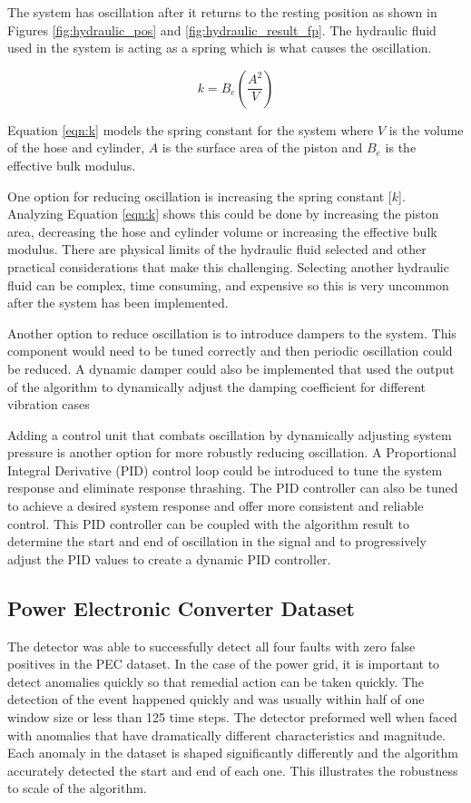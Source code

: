 The system has oscillation after it returns to the resting position as shown in Figures \ref{fig:hydraulic_pos} and \ref{fig:hydraulic_result_fp}. The hydraulic fluid used in the system is acting as a spring which is what causes the oscillation. 

\begin{equation}
    k = B_e \left ( \frac{A^2}{V} \right)
    \label{eqn:k}
\end{equation}

Equation \eqref{eqn:k} models the spring constant for the system where $V$ is the volume of the hose and cylinder, $A$ is the surface area of the piston and $B_e$ is the effective bulk modulus. 

One option for reducing oscillation is increasing the spring constant [$k$]. Analyzing Equation \eqref{eqn:k} shows this could be done by increasing the piston area, decreasing the hose and cylinder volume or increasing the effective bulk modulus. There are physical limits of the hydraulic fluid selected and other practical considerations that make this challenging. Selecting another hydraulic fluid can be complex, time consuming, and expensive so this is very uncommon after the system has been implemented. 

Another option to reduce oscillation is to introduce dampers to the system. This component would need to be tuned correctly and then periodic oscillation could be reduced. A dynamic damper could also be implemented that used the output of the algorithm to dynamically adjust the damping coefficient for different vibration cases 

Adding a control unit that combats oscillation by dynamically adjusting system pressure is another option for more robustly reducing oscillation. A Proportional Integral Derivative (PID) control loop could be introduced to tune the system response and eliminate response thrashing. The PID controller can also be tuned to achieve a desired system response and offer more consistent and reliable control. This PID controller can be coupled with the algorithm result to determine the start and end of oscillation in the signal and to progressively adjust the PID values to create a dynamic PID controller.


\subsection{Power Electronic Converter Dataset}

The detector was able to successfully detect all four faults with zero false positives in the PEC dataset. In the case of the power grid, it is important to detect anomalies quickly so that remedial action can be taken quickly.  The detection of the event happened quickly and was usually within half of one window size or less than 125 time steps. The detector preformed well when faced with anomalies that have dramatically different characteristics and magnitude. Each anomaly in the dataset is shaped significantly differently and the algorithm accurately detected the start and end of each one. This illustrates the robustness to scale of the algorithm.

